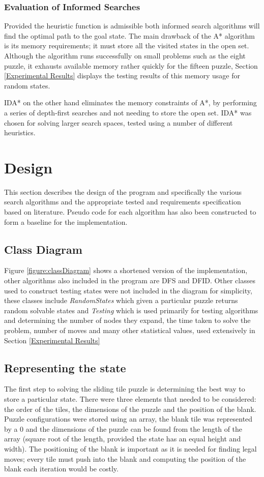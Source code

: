 \documentclass[final]{cmpreport}
\begin{document}
\subsubsection{Evaluation of Informed Searches}
Provided the heuristic function is admissible both informed search algorithms will find the optimal path to the goal state. The main drawback of the A* algorithm is its memory requirements; it must store all the visited states in the open set. Although the algorithm runs successfully on small problems such as the eight puzzle, it exhausts available memory rather quickly for the fifteen puzzle, Section \ref{Experimental Results} displays the testing results of this memory usage for random states. 

IDA* on the other hand eliminates the memory constraints of A*, by performing a series of depth-first searches and not needing to store the open set. IDA* was chosen for solving larger search spaces, tested using a number of different heuristics. 




\section{Design}
This section describes the design of the program and specifically the various search algorithms and the appropriate tested and requirements specification based on literature. Pseudo code for each algorithm has also been constructed to form a baseline for the implementation.
\subsection{Class Diagram}
Figure \ref{figure:classDiagram} shows a shortened version of the implementation, other algorithms also included in the program are DFS and DFID. Other classes used to construct testing states were not included in the diagram for simplicity, these classes include \textit{RandomStates} which given a particular puzzle returns random solvable states and \textit{Testing} which is used primarily for testing algorithms and determining the number of nodes they expand, the time taken to solve the problem, number of moves and many other statistical values, used extensively in Section \ref{Experimental Results}


\subsection{Representing the state}
The first step to solving the sliding tile puzzle is determining the best way to store a particular state. There were three elements that needed to be considered: the order of the tiles, the dimensions of the puzzle and the position of the blank. Puzzle configurations were stored using an array, the blank tile was represented by a 0 and the dimensions of the puzzle can be found from the length of the array (square root of the length, provided the state has an equal height and width). The positioning of the blank is important as it is needed for finding legal moves; every tile must push into the blank and computing the position of the blank each iteration would be costly.
\end{document}
